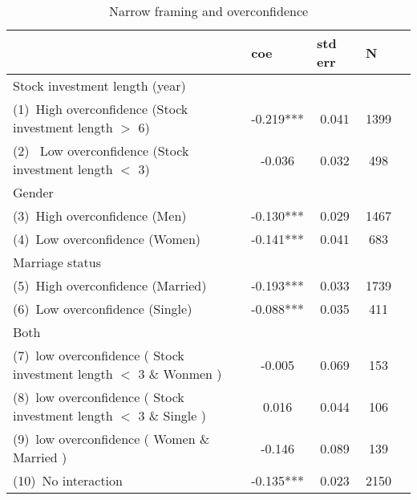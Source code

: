 \documentclass[ukenglish,nottitlepage,thmsb,11pt,letterpaper]{article}
\begin{document}
\begin{table}[H]
	\centering
	\caption{Narrow framing and overconfidence}
		\begin{tabular*}{\textwidth}{l @{\extracolsep{\fill}} cccc}
		\toprule
		& \multicolumn{1}{l}{coe} & \multicolumn{1}{l}{std err} & \multicolumn{1}{l}{N} \\
		\midrule
		Stock investment length (year) &            &            &  \\
		\midrule
		(1)\  High overconfidence (Stock investment length $>$ 6) & -0.219***    & 0.041      & 1399 \\
		(2) \ Low overconfidence (Stock investment length $<$ 3) & -0.036    & 0.032      & 498 \\
		\midrule
		Gender     &            &            &  \\
		\midrule
		(3)\  High overconfidence (Men) & -0.130***    & 0.029      & 1467 \\
		(4)\  Low overconfidence (Women) & -0.141***    & 0.041      & 683 \\
		\midrule
		Marriage status &            &            &  \\
		\midrule
		(5)\  High overconfidence (Married) & -0.193***     & 0.033      & 1739 \\
		(6)\  Low overconfidence (Single) & -0.088***     & 0.035      & 411 \\
		\midrule
		Both       &            &            &  \\
		(7)\ low overconfidence ( Stock investment length $<$ 3 \& Wonmen  ) & -0.005    & 0.069      & 153 \\
		(8)\ low overconfidence ( Stock investment length $<$ 3 \& Single  ) & 0.016     & 0.044      & 106 \\
		(9)\ low overconfidence ( Women \& Married  ) & -0.146    & 0.089      & 139 \\
		(10)\ No interaction & -0.135***    & 0.023      & 2150 \\
		\bottomrule
	\end{tabular*}%
	\label{tab:addlabel}%
		\begin{tablenotes}
		\small

\end{tablenotes}
\end{table}
\end{document}
